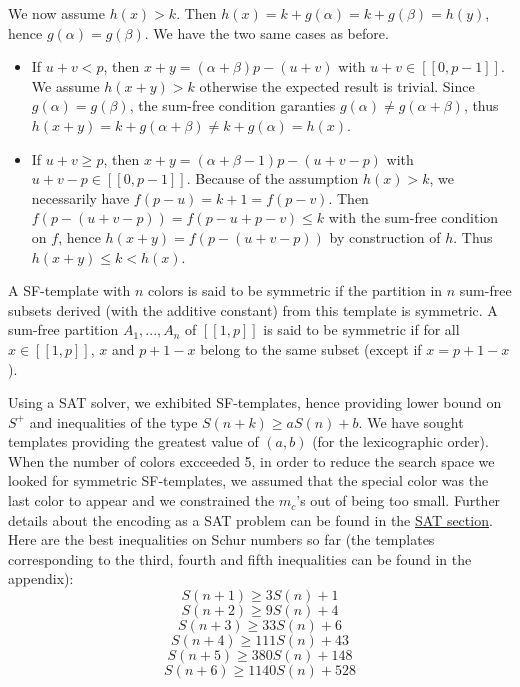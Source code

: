 We now assume \(h(x) > k\). Then \(h(x) = k + g(\alpha) = k + g(\beta) = h(y)\), hence \(g(\alpha) = g(\beta)\). 
We have the two same cases as before.

\begin{itemize}
\item If \(u+v < p\), then \(x+y = (\alpha+\beta)p - (u+v) \) with \(u+v \in [\![0,p-1]\!] \).
We assume \(h(x+y) > k\) otherwise the expected result is trivial.
Since \(g(\alpha) = g(\beta)\), the sum-free condition garanties \(g(\alpha) \neq g(\alpha+\beta)\), 
thus \(h(x+y) = k + g(\alpha + \beta) \neq k + g(\alpha) = h(x)\).
\item If \(u+v \geqslant p\), then \(x+y = (\alpha+\beta-1)p - (u+v-p) \) with \(u+v-p \in [\![0,p-1]\!] \).
Because of the assumption \(h(x) > k\), we necessarily have \(f(p-u) = k+1 = f(p-v)\). 
Then \(f(p-(u+v-p)) = f(p-u + p-v) \leqslant k \) with the sum-free condition on \(f\), 
hence \(h(x+y) = f(p-(u+v-p)) \) by construction of \(h\). Thus \(h(x+y) \leqslant k < h(x)\).
\end{itemize}

\begin{definition}
A SF-template with \(n\) colors is said to be symmetric if the partition in \(n\) sum-free subsets derived (with the additive constant) from this template is symmetric. 
A sum-free partition \(A_1, ..., A_n\) of \([\![1, p]\!]\) is said to be symmetric if for all \( x \in [\![1, p]\!]\), \(x\) and \(p + 1 - x\) belong to the same subset 
(except if \(x = p + 1 - x\)).
\end{definition}

Using a SAT solver, we exhibited SF-templates, hence providing lower bound on \(S^+\) and inequalities 
of the type \(S(n+k) \geqslant a S(n) + b\). We have sought templates providing the greatest value of 
\((a, b)\) (for the lexicographic order). When the number of colors excceeded 5, in order to reduce the search space we 
looked for symmetric SF-templates, we assumed that the special color was the last color to appear and we constrained 
the \(m_c\)'s out of being too small. Further details about the encoding as a SAT problem can be found in the
\hyperref[SAT]{SAT section}. \\

Here are the best inequalities on Schur numbers so far (the templates corresponding to the third, fourth and fifth 
inequalities can be found in the appendix):
\[ S(n+1) \geqslant 3S(n) + 1 \]
\[ S(n+2) \geqslant 9S(n) + 4 \]
\[ S(n+3) \geqslant 33S(n) + 6 \]
\[ S(n+4) \geqslant 111S(n) + 43 \]
\[ S(n+5) \geqslant 380S(n) + 148 \]
\[ S(n+6) \geqslant 1140S(n) + 528 \]

